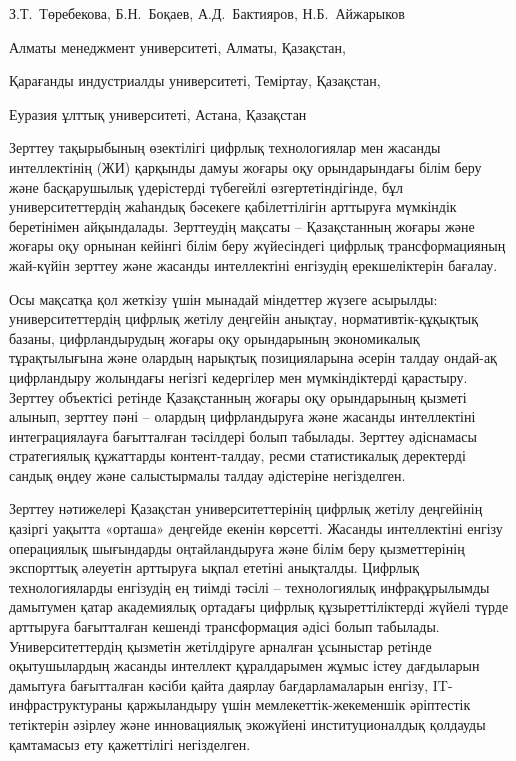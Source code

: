 
\begin{header}

З.Т.~Төребекова\envelope,
Б.Н.~Боқаев,
А.Д.~Бактияров,
Н.Б.~Айжарыков
\end{header}

\begin{affil}
Алматы менеджмент университеті, Алматы, Қазақстан,

Қарағанды индустриалды университеті, Теміртау, Қазақстан,

Еуразия ұлттық университеті, Астана, Қазақстан

\end{affil}

Зерттеу тақырыбының өзектілігі цифрлық технологиялар мен жасанды
интеллектінің (ЖИ) қар\-қынды дамуы жоғары оқу орындарындағы білім беру
және басқарушылық үдерістерді түбегейлі өзгертетіндігінде, бұл
университеттердің жаһандық бәсекеге қабілеттілігін арттыруға мүмкіндік
беретінімен айқындалады. Зерттеудің мақсаты -- Қазақстанның жоғары және
жоғары оқу орнынан кейінгі білім беру жүйесіндегі цифрлық
трансформацияның жай-күйін зерттеу және жасанды интеллектіні енгізудің
ерекшеліктерін бағалау.

Осы мақсатқа қол жеткізу үшін мынадай міндеттер жүзеге асырылды:
университеттердің цифрлық жетілу деңгейін анықтау, нормативтік-құқықтық
базаны, цифрландырудың жоғары оқу орындарының экономикалық тұрақтылығына
және олардың нарықтық позицияларына әсерін талдау ондай-ақ цифрландыру
жолындағы негізгі кедергілер мен мүмкіндіктерді қарастыру. Зерттеу
объектісі ретінде Қазақстанның жоғары оқу орындарының қызметі алынып,
зерттеу пәні -- олардың цифрландыруға және жасанды интеллектіні
интеграциялауға бағытталған тәсілдері болып табылады. Зерттеу әдіснамасы
стратегиялық құжаттарды контент-талдау, ресми статистикалық деректерді
сандық өңдеу және салыстырмалы талдау әдістеріне негізделген.

Зерттеу нәтижелері Қазақстан университеттерінің цифрлық жетілу
деңгейінің қазіргі уақытта «орташа» деңгейде екенін көрсетті. Жасанды
интеллектіні енгізу операциялық шығындарды оңтайландыруға және білім
беру қызметтерінің экспорттық әлеуетін арттыруға ықпал ететіні
анықталды. Цифрлық технологияларды енгізудің ең тиімді тәсілі
-- технологиялық инфрақұрылымды дамытумен қатар академиялық ортадағы
цифрлық құзыреттіліктерді жүйелі түрде арттыруға бағытталған кешенді
трансформация әдісі болып табылады. Университеттердің қызметін
жетілдіруге арналған ұсыныстар ретінде оқытушылардың жасанды интеллект
құралдарымен жұмыс істеу дағдыларын дамытуға бағытталған кәсіби қайта
даярлау бағдарламаларын енгізу, IT-инфраструктураны қаржыландыру үшін
мемлекеттік-жекеменшік әріптестік тетіктерін әзірлеу және инновациялық
экожүйені институционалдық қолдауды қамтамасыз ету қажеттілігі
негізделген.


